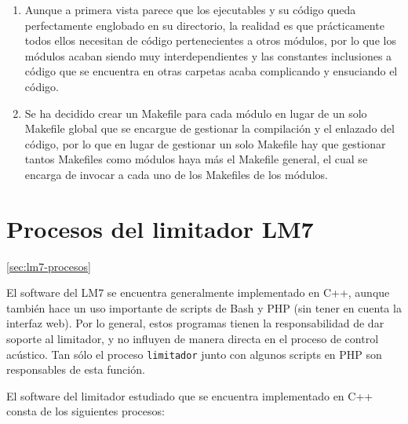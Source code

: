 \begin{enumerate}
    \item Aunque a primera vista parece que los ejecutables y su código queda perfectamente englobado en su directorio, la realidad es que prácticamente todos ellos necesitan de código pertenecientes a otros módulos, por lo que los módulos acaban siendo muy interdependientes y las constantes inclusiones a código que se encuentra en otras carpetas acaba complicando y ensuciando el código.

    \item Se ha decidido crear un Makefile para cada módulo en lugar de un solo Makefile global que se encargue de gestionar la compilación y el enlazado del código, por lo que en lugar de gestionar un solo Makefile hay que gestionar tantos Makefiles como módulos haya más el Makefile general, el cual se encarga de invocar a cada uno de los Makefiles de los módulos.
\end{enumerate}

\section{Procesos del limitador LM7} \ref{sec:lm7-procesos}

El software del LM7 se encuentra generalmente implementado en C++, aunque también hace un uso importante de scripts de Bash y PHP (sin tener en cuenta la interfaz web). Por lo general, estos programas tienen la responsabilidad de dar soporte al limitador, y no influyen de manera directa en el proceso de control acústico. Tan sólo el proceso \verb|limitador| junto con algunos scripts en PHP son responsables de esta función.

El software del limitador estudiado que se encuentra implementado en C++ consta de los siguientes procesos:


